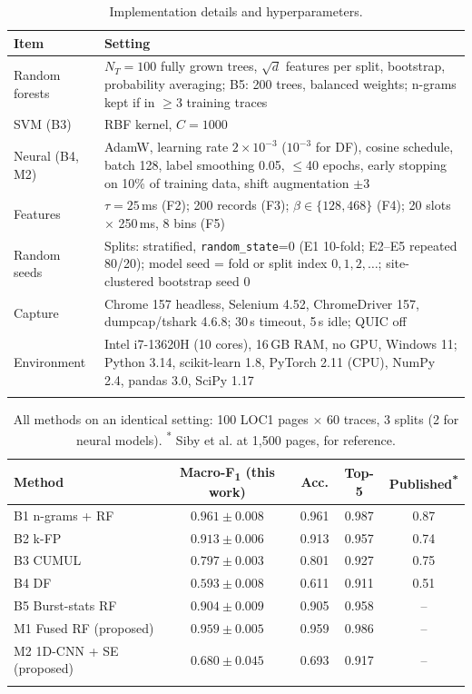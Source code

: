 \documentclass[pdflatex,sn-mathphys-num]{sn-jnl}
\newcommand{\Fone}{F\textsubscript{1}}
\newcommand{\pub}{\textsuperscript{*}}
\begin{document}
\begin{appendices}
\begin{table}[h]
\caption{Implementation details and hyperparameters.}\label{tab:impl}
\scriptsize
\begin{tabular*}{\textwidth}{@{\extracolsep\fill}L{0.20\textwidth}L{0.74\textwidth}@{}}
\toprule
Item & Setting \\
\midrule
Random forests & $N_T=100$ fully grown trees, $\sqrt{d}$ features per split, bootstrap, probability averaging; B5: 200 trees, balanced weights; n-grams kept if in $\ge3$ training traces \\
SVM (B3) & RBF kernel, $C=1000$ \\
Neural (B4, M2) & AdamW, learning rate $2\times10^{-3}$ ($10^{-3}$ for DF), cosine schedule, batch 128, label smoothing 0.05, $\le$40 epochs, early stopping on 10\% of training data, shift augmentation $\pm3$ \\
Features & $\tau=25$\,ms (F2); 200 records (F3); $\beta\in\{128,468\}$ (F4); 20 slots $\times$ 250\,ms, 8 bins (F5) \\
Random seeds & Splits: stratified, \texttt{random\_state}=0 (E1 10-fold; E2--E5 repeated 80/20); model seed = fold or split index $0,1,2,\dots$; site-clustered bootstrap seed 0 \\
Capture & Chrome 157 headless, Selenium 4.52, ChromeDriver 157, dumpcap/tshark 4.6.8; 30\,s timeout, 5\,s idle; QUIC off \\
Environment & Intel i7-13620H (10 cores), 16\,GB RAM, no GPU, Windows 11; Python 3.14, scikit-learn 1.8, PyTorch 2.11 (CPU), NumPy 2.4, pandas 3.0, SciPy 1.17 \\
\botrule
\end{tabular*}
\end{table}

\begin{table}[h]
\caption{All methods on an identical setting: 100 LOC1 pages $\times$ 60 traces, 3 splits (2 for neural models). \pub{} Siby et al. at 1,500 pages, for reference.}\label{tab:samedata}
\scriptsize
\begin{tabular*}{\textwidth}{@{\extracolsep\fill}lcccc@{}}
\toprule
Method & Macro-\Fone{} (this work) & Acc. & Top-5 & Published\pub{} \\
\midrule
B1 n-grams + RF & $0.961\pm0.008$ & 0.961 & 0.987 & 0.87 \\
B2 k-FP & $0.913\pm0.006$ & 0.913 & 0.957 & 0.74 \\
B3 CUMUL & $0.797\pm0.003$ & 0.801 & 0.927 & 0.75 \\
B4 DF & $0.593\pm0.008$ & 0.611 & 0.911 & 0.51 \\
B5 Burst-stats RF & $0.904\pm0.009$ & 0.905 & 0.958 & -- \\
M1 Fused RF (proposed) & $0.959\pm0.005$ & 0.959 & 0.986 & -- \\
M2 1D-CNN + SE (proposed) & $0.680\pm0.045$ & 0.693 & 0.917 & -- \\
\botrule
\end{tabular*}
\end{table}


\end{appendices}
\end{document}
